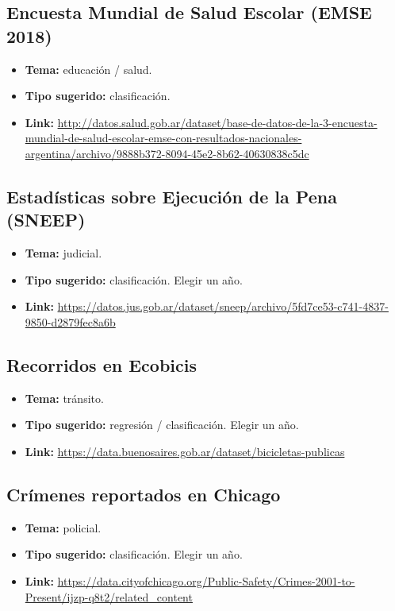 \documentclass[12pt]{article}
\begin{document}
\subsection{Encuesta Mundial de Salud Escolar (EMSE 2018)}
\begin{itemize}
    \item \textbf{Tema:} educación / salud.
    \item \textbf{Tipo sugerido:} clasificación.
    \item \textbf{Link:} \url{http://datos.salud.gob.ar/dataset/base-de-datos-de-la-3-encuesta-mundial-de-salud-escolar-emse-con-resultados-nacionales-argentina/archivo/9888b372-8094-45e2-8b62-40630838c5dc}
\end{itemize}

\subsection{Estadísticas sobre Ejecución de la Pena (SNEEP)}
\begin{itemize}
    \item \textbf{Tema:} judicial.
    \item \textbf{Tipo sugerido:} clasificación. Elegir un año.
    \item \textbf{Link:} \url{https://datos.jus.gob.ar/dataset/sneep/archivo/5fd7ce53-c741-4837-9850-d2879fec8a6b}
\end{itemize}

\subsection{Recorridos en Ecobicis}
\begin{itemize}
    \item \textbf{Tema:} tránsito.
    \item \textbf{Tipo sugerido:} regresión / clasificación. Elegir un año.
    \item \textbf{Link:} \url{https://data.buenosaires.gob.ar/dataset/bicicletas-publicas}
\end{itemize}

\subsection{Crímenes reportados en Chicago}
\begin{itemize}
    \item \textbf{Tema:} policial.
    \item \textbf{Tipo sugerido:} clasificación. Elegir un año.
    \item \textbf{Link:} \url{https://data.cityofchicago.org/Public-Safety/Crimes-2001-to-Present/ijzp-q8t2/related_content}
\end{itemize}
\end{document}
